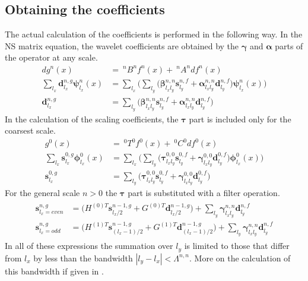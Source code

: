 \subsection*{Obtaining the coefficients}
The actual calculation of the coefficients is performed in the following way.
In the NS matrix equation, the wavelet coefficients are obtained by the 
$\boldsymbol{\gamma}$ and $\boldsymbol{\alpha}$ parts of the operator at any 
scale.
\begin{align}
	\nonumber
	dg^n(x) &=\ ^nB^nf^n(x) +\ ^nA^n df^n(x)\\
	\nonumber
	\sum_{l_x} \boldsymbol{d}^{n,g}_{l_x}\boldsymbol{\psi}^n_{l_x}(x)
	&= \sum_{l_x}\Bigg(\sum_{l_y}
	\bigg(\boldsymbol{\beta}_{l_xl_y}^{n,n}\boldsymbol{s}^{n,f}_{l_y} +
	\boldsymbol{\alpha}^{n,n}_{l_xl_y}\boldsymbol{d}^{n,f}_{l_y}\bigg)
	\boldsymbol{\psi}_{l_x}^n(x)\Bigg)\\
	\boldsymbol{d}^{n,g}_{l_x} &= 
	\sum_{l_y}\bigg(\boldsymbol{\beta}_{l_xl_y}^{n,n}\boldsymbol{s}^{n,f}_{l_y}
	+ \boldsymbol{\alpha}^{n,n}_{l_xl_y}\boldsymbol{d}^{n,f}_{l_y}\bigg)
\end{align}
In the calculation of the scaling coefficients, the $\boldsymbol{\tau}$ part is
included only for the coarsest scale.
\begin{align}
	\nonumber
	g^0(x) &=\ ^0T^0f^0(x) +\ ^0C^0 df^0(x)\\
	\nonumber
	\sum_{l_x} \boldsymbol{s}^{0,g}_{l_x}\boldsymbol{\phi}^0_{l_x}(x)
	&= \sum_{l_x}\Bigg(\sum_{l_y}
	\bigg(\boldsymbol{\tau}_{l_xl_y}^{0,0}\boldsymbol{s}^{0,f}_{l_y} +
	\boldsymbol{\gamma}^{0,0}_{l_xl_y}\boldsymbol{d}^{0,f}_{l_y}\bigg)
	\boldsymbol{\phi}_{l_x}^0(x)\Bigg)\\
	\boldsymbol{s}^{0,g}_{l_x} &= 
	\sum_{l_y}\bigg(\boldsymbol{\tau}_{l_xl_y}^{0,0}\boldsymbol{s}^{0,f}_{l_y}
	+ \boldsymbol{\gamma}^{0,0}_{l_xl_y}\boldsymbol{d}^{0,f}_{l_y}\bigg)
\end{align}
For the general scale $n>0$ the $\boldsymbol{\tau}$ part is substituted with a
filter operation.
\begin{align}
	\begin{split}
	\boldsymbol{s}^{n,g}_{l_x=even} &= \bigg(H^{(0)T}
	\boldsymbol{s}^{n-1,g}_{l_x/2} +
	G^{(0)T}\boldsymbol{d}^{n-1,g}_{l_x/2}\bigg) + \sum_{l_y}
	\boldsymbol{\gamma}^{n,n}_{l_xl_y}\boldsymbol{d}^{n,f}_{l_y}\\
	\boldsymbol{s}^{n,g}_{l_x=odd} &= \bigg(H^{(1)T}
	\boldsymbol{s}^{n-1,g}_{(l_x-1)/2} +
	G^{(1)T}\boldsymbol{d}^{n-1,g}_{(l_x-1)/2}\bigg) + \sum_{l_y}
	\boldsymbol{\gamma}^{n,n}_{l_xl_y}\boldsymbol{d}^{n,f}_{l_y}
	\end{split}
\end{align}
In all of these expressions the summation over $l_y$ is limited to those that
differ from $l_x$ by less than the bandwidth $|l_y-l_x| < \Lambda^{n,n}$. More
on the calculation of this bandwidth if given in \cite{Fossgaard}.

\pagebreak

